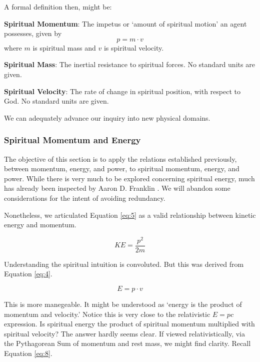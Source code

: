 \documentclass{article}
\begin{document}
                A formal definition then, might be: 
                
                \begin{center}
                  
                    \textbf{Spiritual Momentum}: The impetus or `amount of spiritual motion' an agent possesses, given by
                    \[p = m\cdot v\] 
                    where $m$ is spiritual mass and $v$ is spiritual velocity.

                    \textbf{Spiritual Mass}: The inertial resistance to spiritual forces. No standard units are given.

                    \textbf{Spiritual Velocity}: The rate of change in spiritual position, with respect to God. No standard units are given.
                    
                \end{center}
                
                We can adequately advance our inquiry into new physical domains. 

            \subsubsection{Spiritual Momentum and Energy}
                The objective of this section is to apply the relations established previously, between momentum, energy, and power, to spiritual momentum, energy, and power.
                While there is very much to be explored concerning spiritual energy, much has already been inspected by Aaron D. Franklin \cite{Franklin}. We will abandon some considerations for the intent of avoiding redundancy.

                Nonetheless, we articulated Equation \ref{eq:5} as a valid relationship between kinetic energy and momentum.

                \[KE = \dfrac{p^2}{2m}\]

                Understanding the spiritual intuition is convoluted. But this was derived from Equation \ref{eq:4}.

                \[E = p\cdot v\]
                
                This is more manegeable. It might be understood as `energy is the product of momentum and velocity.' Notice this is very close to the relativistic $E = pc$ expression.
                Is spiritual energy the product of spiritual momentum multiplied with spiritual velocity? The answer hardly seems clear. 
                If viewed relativistically, via the Pythagorean Sum of momentum and rest mass, we might find clarity. Recall Equation \ref{eq:8}.
\end{document}

